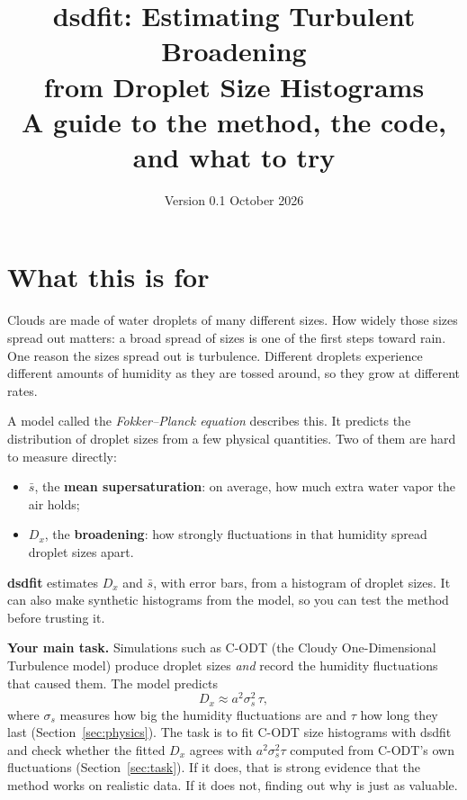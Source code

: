 \documentclass[11pt]{article}
\title{\textbf{dsdfit}: Estimating Turbulent Broadening\\from Droplet Size Histograms\\[4pt]
\large A guide to the method, the code, and what to try}
\date{Version 0.1 \quad October 2026}
\newcommand{\sbar}{\bar s}
\newcommand{\Dx}{D_x}
\begin{document}
\maketitle
\vspace{-1.5em}
\tableofcontents

\section{What this is for}

Clouds are made of water droplets of many different sizes. How widely those sizes spread out matters: a
broad spread of sizes is one of the first steps toward rain. One reason the sizes spread out is
turbulence. Different droplets experience different amounts of humidity as they are tossed around, so
they grow at different rates.

A model called the \emph{Fokker--Planck equation} describes this. It predicts the distribution of
droplet sizes from a few physical quantities. Two of them are hard to measure directly:
\begin{itemize}
\item $\sbar$, the \textbf{mean supersaturation}: on average, how much extra water vapor the air holds;
\item $\Dx$, the \textbf{broadening}: how strongly fluctuations in that humidity spread droplet sizes apart.
\end{itemize}
\textbf{dsdfit} estimates $\Dx$ and $\sbar$, with error bars, from a histogram of droplet sizes. It can
also make synthetic histograms from the model, so you can test the method before trusting it.

\begin{notebox}
\textbf{Your main task.} Simulations such as C-ODT (the Cloudy One-Dimensional Turbulence model) produce
droplet sizes \emph{and} record the humidity fluctuations that caused them. The model predicts
\begin{equation}
\Dx \approx a^2 \sigma_s^2\, \tau ,
\label{eq:Dx}
\end{equation}
where $\sigma_s$ measures how big the humidity fluctuations are and $\tau$ how long they last
(Section~\ref{sec:physics}). The task is to fit C-ODT size histograms with dsdfit and check whether the fitted
$\Dx$ agrees with $a^2\sigma_s^2\tau$ computed from C-ODT's own fluctuations (Section~\ref{sec:task}). If it
does, that is strong evidence that the method works on realistic data. If it does not, finding out why is
just as valuable.
\end{notebox}
\end{document}
